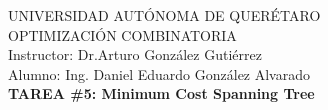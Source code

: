 \begin{center}

\LARGE
UNIVERSIDAD AUTÓNOMA DE QUERÉTARO \\
OPTIMIZACIÓN COMBINATORIA \\[0.3cm]

\Large
Instructor: Dr.Arturo González Gutiérrez \\
Alumno: Ing. Daniel Eduardo González Alvarado \\%
\large
\textbf{TAREA \#5: Minimum Cost Spanning Tree}\\


\end{center}